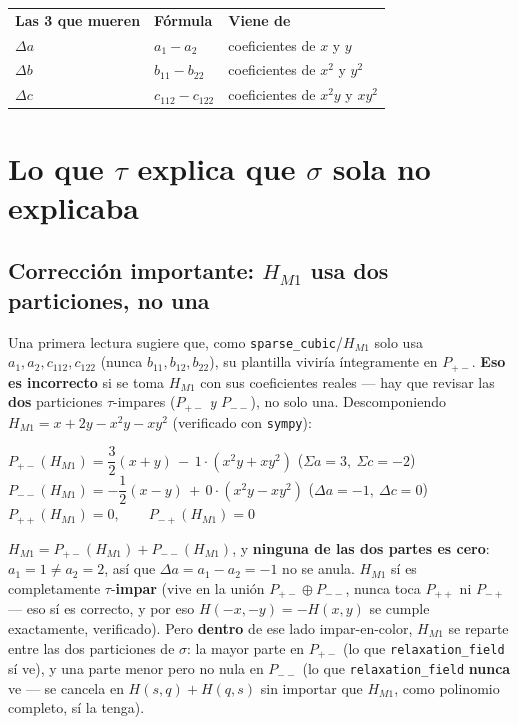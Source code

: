 \documentclass[11pt, a4paper]{article}
\newcommand{\TH}[1]{\cellcolor{cTHbg}\color{white}\textbf{#1}}
\begin{document}
\begin{center}
\begin{tabular}{lll}
  \TH{Las 3 que mueren} & \TH{F\'ormula} & \TH{Viene de} \\[1pt]
  $\Delta a$ & $a_1-a_2$       & coeficientes de $x$ y $y$ \\
  $\Delta b$ & $b_{11}-b_{22}$ & coeficientes de $x^2$ y $y^2$ \\
  $\Delta c$ & $c_{112}-c_{122}$ & coeficientes de $x^2y$ y $xy^2$ \\
\end{tabular}
\end{center}

\section{Lo que $\tau$ explica que $\sigma$ sola no explicaba}
\label{sec:paraque2}

\subsection{Correcci\'on importante: $H_{M1}$ usa \textbf{dos} particiones, no una}

Una primera lectura sugiere que, como \texttt{sparse\_cubic}/$H_{M1}$
solo usa $a_1,a_2,c_{112},c_{122}$ (nunca $b_{11},b_{12},b_{22}$), su
plantilla vivir\'ia \'integramente en $P_{+-}$. \textbf{Eso es
incorrecto} si se toma $H_{M1}$ con sus coeficientes reales
--- hay que revisar las \textbf{dos} particiones $\tau$-impares
($P_{+-}$ \emph{y} $P_{--}$), no solo una. Descomponiendo
$H_{M1}=x+2y-x^2y-xy^2$ (verificado con \texttt{sympy}):

\begin{tcolorbox}[codebox]
$P_{+-}(H_{M1}) = \dfrac{3}{2}(x{+}y) \,-\, 1\cdot(x^2y{+}xy^2)$
\hfill ($\Sigma a{=}3,\ \Sigma c{=}{-}2$) \\[4pt]
$P_{--}(H_{M1}) = -\dfrac{1}{2}(x{-}y) \,+\, 0\cdot(x^2y{-}xy^2)$
\hfill ($\Delta a{=}{-}1,\ \Delta c{=}0$) \\[4pt]
$P_{++}(H_{M1}) = 0, \qquad P_{-+}(H_{M1}) = 0$
\end{tcolorbox}

$H_{M1} = P_{+-}(H_{M1}) + P_{--}(H_{M1})$, y \textbf{ninguna de las
dos partes es cero}: $a_1=1\neq a_2=2$, as\'i que $\Delta a=a_1-a_2=-1$
no se anula. $H_{M1}$ s\'i es completamente $\tau$-\textbf{impar}
(vive en la uni\'on $P_{+-}\oplus P_{--}$, nunca toca $P_{++}$ ni
$P_{-+}$ --- eso s\'i es correcto, y por eso $H(-x,-y)=-H(x,y)$ se
cumple exactamente, verificado). Pero \textbf{dentro} de ese lado
impar-en-color, $H_{M1}$ se reparte entre las dos particiones de
$\sigma$: la mayor parte en $P_{+-}$ (lo que \texttt{relaxation\_field}
s\'i ve), y una parte menor pero no nula en $P_{--}$ (lo que
\texttt{relaxation\_field} \textbf{nunca} ve --- se cancela en
$H(s,q)+H(q,s)$ sin importar que $H_{M1}$, como polinomio completo,
s\'i la tenga).
\end{document}
